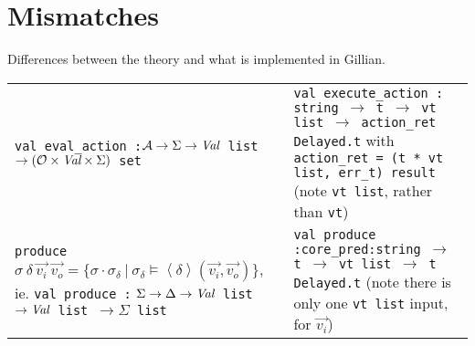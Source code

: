 \documentclass[,a4paper,oneside]{article}
\newcommand{\code}[1]{\texttt{#1}}
\newcommand{\rarr}{\ensuremath{\rightarrow}}
\begin{document}
\section{Mismatches}

Differences between the theory and what is implemented in Gillian.

\begin{tabularx}{\textwidth}{X|X}
	\thead{\bfseries Theory} & \thead{\bfseries Gillian} \\ \hline\hline
\code{val eval\_action :\newline ${\cal A}\rarr\Sigma\rarr \textrm{\it Val}$ list $\rarr ({\cal O}\times \textrm{\it Val} \times \Sigma)$ set}
	& \small\code{val execute\_action :\newline
    string $\rarr$ t $\rarr$ vt list $\rarr$ action\_ret Delayed.t}
    with \code{action\_ret = (t * vt list, err\_t) result} (note \code{vt list}, rather than \code{vt})
    \\\hline
    \code{produce }$\sigma ~\delta ~\vec{v_i}~\vec{v_o} = \{ \sigma\cdot\sigma_\delta ~|~\sigma_\delta \vDash \left<\delta\right> (\vec{v_i}, \vec{v_o}) \}$, ie.\newline
    \small\code{val produce :}\newline
    \code{$\Sigma\rarr\Delta \rarr \textrm{\it Val}$ list $\rarr \textrm{\it Val}$ list $\rarr \Sigma$ list}
    & \small\code{val produce :\newline core\_pred:string $\rarr$ t $\rarr$ vt list $\rarr$ t Delayed.t} (note there is only one \code{vt list} input, for $\vec{v_i}$)
    
\end{tabularx}
\end{document}
